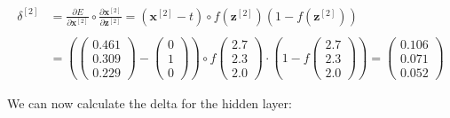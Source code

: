 \documentclass[12pt]{article}
\begin{document}
\begin{enumerate}
\begin{equation*}
    \begin{aligned}
        \delta^{[2]} &= \frac{\partial E}{\partial \mathbf{x}^{[2]}} \circ \frac{\partial \mathbf{x}^{[2]}}{\partial \mathbf{z}^{[2]}} = (\mathbf{x}^{[2]} - t) \circ f(\mathbf{z}^{[2]})(1 - f(\mathbf{z}^{[2]}))\\
        \\
        &=\left( \begin{pmatrix} 
            0.461 \\
            0.309 \\
            0.229
            \end{pmatrix} -
            \begin{pmatrix} 
            0\\     
            1\\
            0 
            \end{pmatrix} \right)
            \circ f\begin{pmatrix}
            2.7 \\
            2.3 \\
            2.0 
            \end{pmatrix}
            \cdot \left(1 - f\begin{pmatrix}
            2.7 \\
            2.3 \\
            2.0
            \end{pmatrix}\right) = \begin{pmatrix}
            0.106\\
            0.071\\
            0.052
            \end{pmatrix}
    \end{aligned}
\end{equation*}

We can now calculate the delta for the hidden layer:


\end{enumerate}
\end{document}
